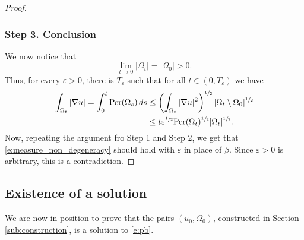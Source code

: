 \documentclass[11pt]{article}
\numberwithin{equation}{section}
\newcommand{\Per}{\mathrm{Per}}
\theoremstyle{plain}
\theoremstyle{definition}
\let\eps\varepsilon
\begin{document}
\begin{proof}
\subsubsection*{Step 3. Conclusion} We now notice that
\[\lim_{t\to0}|\Omega_t|=|\Omega_0|>0.\]
Thus, for every $\eps>0$, there is $T_\eps$ such that for all $t\in(0,T_\eps)$ we have
\begin{equation}
\begin{split}
\int_{\Omega_t}|\nabla u|=\int_0^t\Per(\Omega_s)\,ds&\le \left(\int_{\Omega_t}|\nabla u|^2\right)^{\sfrac12}|\Omega_t\setminus\Omega_0|^{\sfrac12}\\
&\le t\eps ^{\sfrac12}\Per(\Omega_t)^{\sfrac12}|\Omega_t|^{\sfrac12}.
\end{split}
\end{equation}
Now, repeating the argument fro Step 1 and Step 2, we get that \eqref{e:measure_non_degeneracy} should hold with $\eps$ in place of $\beta$. Since $\eps>0$ is arbitrary, this is a contradiction.
\end{proof}

\subsection{Existence of a solution}
We are now in position to prove that the pairs $(u_0,\Omega_0)$, constructed in Section \ref{sub:construction}, is a solution to \eqref{e:pb}.
\end{document}
